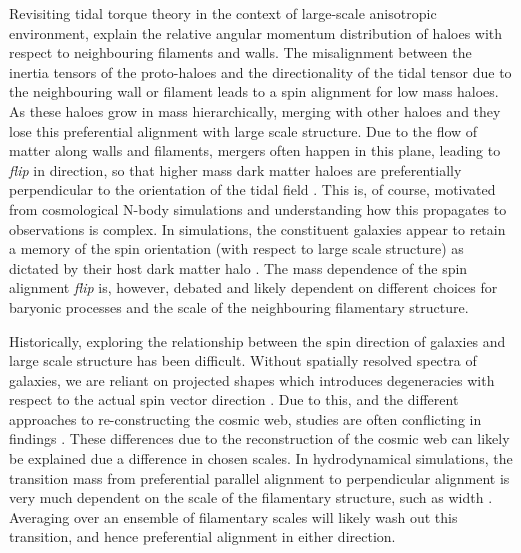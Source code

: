 Revisiting tidal torque theory \citep[TTT; e.g.][]{hoyle1951, peebles1969} in the context of large-scale anisotropic environment, \citet{codis2015} explain the relative angular momentum distribution of haloes with respect to neighbouring filaments and walls. The misalignment between the inertia tensors of the proto-haloes and the directionality of the tidal tensor due to the neighbouring wall or filament leads to a spin alignment for low mass haloes. As these haloes grow in mass hierarchically, merging with other haloes and they lose this preferential alignment with large scale structure. Due to the flow of matter along walls and filaments, mergers often happen in this plane, leading to \textit{flip} in direction, so that higher mass dark matter haloes are preferentially perpendicular to the orientation of the tidal field \citep[e.g.][]{Codis2012, dubois2014, GaneshaiahVeena2018}. This is, of course, motivated from cosmological N-body simulations and understanding how this propagates to observations is complex. In simulations, the constituent galaxies appear to retain a memory of the spin orientation (with respect to large scale structure) as dictated by their host dark matter halo \citep[e.g.][]{codis2018, Kraljic2019flip}. The mass dependence of the spin alignment \textit{flip} is, however, debated and likely dependent on different choices for baryonic processes and the scale of the neighbouring filamentary structure.


Historically, exploring the relationship between the spin direction of galaxies and large scale structure has been difficult. Without spatially resolved spectra of galaxies, we are reliant on projected shapes which introduces degeneracies with respect to the actual spin vector direction \citep[e.g. see Fig 2. in][for example of degeneracies that can occur]{motloch2020}. Due to this, and the different approaches to re-constructing the cosmic web, studies are often conflicting in findings \citep[e.g. spiral galaxies having parallel vs perpendicular orientations with respect to the cosmic web][]{tempel2013a, tempel2013, lee2007, jones2010, zhang2015}. These differences due to the reconstruction of the cosmic web can likely be explained due a difference in chosen scales. In hydrodynamical simulations, the transition mass from preferential parallel alignment to perpendicular alignment is very much dependent on the scale of the filamentary structure, such as width \citep{ganeshaiahveena2019, Kraljic2019flip}. Averaging over an ensemble of filamentary scales will likely wash out this transition, and hence preferential alignment in either direction. 

